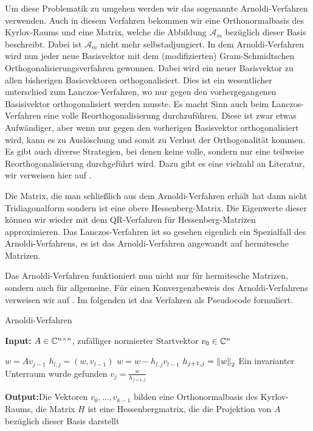 \documentclass{article}
\begin{document}
\begin{theorem}
Um diese Problematik zu umgehen werden wir das sogenannte Arnoldi-Verfahren verwenden. Auch in diesem Verfahren bekommen wir eine Orthonormalbasis des Kyrlov-Raums und eine Matrix, welche die Abbildung $\mathcal{A}_m$ bezüglich dieser Basis beschreibt. Dabei ist $\mathcal{A}_m$ nicht mehr selbstadjungiert. In dem Arnoldi-Verfahren wird nun jeder neue Basisvektor mit dem (modifizierten) Gram-Schmidtschen Orthogonalisierungsverfahren gewonnen. Dabei wird ein neuer Basisvektor zu allen bisherigen Basisvektoren orthogonalisiert. Dies ist ein wesentlicher unterschied zum Lanczos-Verfahren, wo nur gegen den vorhergegangenen Basisivektor orthogonalisiert werden musste.
Es macht Sinn auch beim Lanczos-Verfahren eine volle Reorthogonalisierung durchzuführen. Diese ist zwar etwas Aufwändiger, aber wenn nur gegen den vorherigen Basisvektor orthogonalisiert wird, kann es zu Auslöschung und somit zu Verlust der Orthogonalität kommen. Es gibt auch diverse Strategien, bei denen keine volle, sondern nur eine teilweise Reorthogonalisierung durchgeführt wird. Dazu gibt es eine vielzahl an Literatur, wir verweisen hier auf \cite{reorthogonalization}.

Die Matrix, die man schließlich aus dem Arnoldi-Verfahren erhält hat dann nicht Tridiagonalform sondern ist eine obere Hessenberg-Matrix. Die Eigenwerte dieser können wir wieder mit dem QR-Verfahren für Hessenberg-Matrizen approximieren.
Das Lanczos-Verfahren ist so gesehen eigenlich ein Spezialfall des Arnoldi-Verfahrens, es ist das Arnoldi-Verfahren angewandt auf hermitesche Matrizen.

Das Arnoldi-Verfahren funktioniert nun nicht nur für hermitesche Matrizen, sondern auch für allgemeine. Für einen Konvergenzbeweis des Arnoldi-Verfahrens verweisen wir auf \cite{Saad_book}. Im folgenden ist das Verfahren als Pseudocode formuliert.

\renewcommand{\algorithmicrequire}{\textbf{Input:}}
\renewcommand{\algorithmicensure}{\textbf{Output:}}

\begin{algorithm}[H]

	\caption{Arnoldi-Verfahren}
	\label{Arnoldi-Verfahren}
	\algorithmicrequire{ $A \in \C^{n\times n}$, zufälliger normierter Startvektor $v_0 \in \C^n$}
	\begin{algorithmic}[1]
			\State $w = A v_{j-1}$
				\State $h_{l,j} = (w, v_{l-1})$
				\State $w = w - h_{l,j}v_{l-1}$
			\EndFor
			\State $h_{j+1,j} = \norm[2]{w}$
			\State Ein invarianter Unterraum wurde gefunden
			\Else
				\State $v_j = \frac{w}{h_{j+1,j}}$
			\EndIf
		\EndFor
	\end{algorithmic}
	\algorithmicensure{Die Vektoren $v_0,\dots,v_{k-1}$ bilden eine Orthonormalbasis des Kyrlov-Raums, die Matrix $H$ ist eine Hessenbergmatrix, die die Projektion von $A$ bezüglich dieser Basis darstellt}
\end{algorithm}



\end{theorem}
\end{document}
